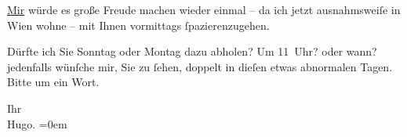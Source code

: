 \pstart
           \uline{Mir} würde es große Freude machen wieder einmal – da
               ich jetzt ausnahmsweiſe in Wien wohne – mit Ihnen
               vormittags ſpazierenzugehen.\pend
           
\pstart
           Dürfte ich Sie Sonntag oder Montag dazu abholen? Um
                  11 Uhr? oder wann? jedenfalls wünſche mir, Sie zu ſehen, doppelt in
               dieſen etwas abnormalen Tagen. Bitte um ein Wort.\pend
           
\pstart
           Ihr{\\[\baselineskip]}\spacefill\mbox{Hugo.}\pend
           \leftskip=0em{}\endnumbering{}  
      